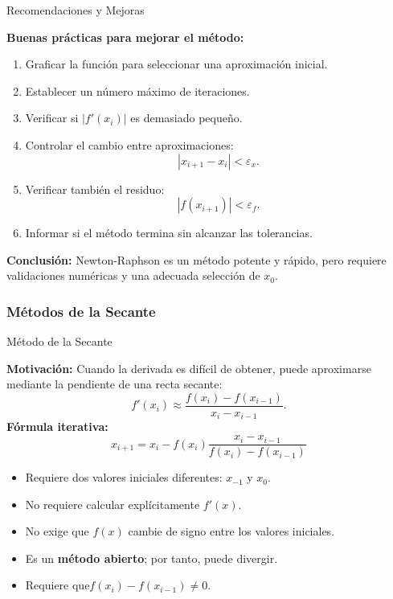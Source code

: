 \documentclass[../../main.tex]{subfiles}
\begin{document}

\begin{frame}{Recomendaciones y Mejoras}

\textbf{Buenas prácticas para mejorar el método:}

\begin{enumerate}
  \item Graficar la función para seleccionar una aproximación inicial.
  \item Establecer un número máximo de iteraciones.
  \item Verificar si \(|f'(x_i)|\) es demasiado pequeño.
  \item Controlar el cambio entre aproximaciones:
  \[
    |x_{i+1}-x_i|<\varepsilon_x.
  \]
  \item Verificar también el residuo:
  \[
    |f(x_{i+1})|<\varepsilon_f.
  \]
  \item Informar si el método termina sin alcanzar las tolerancias.
\end{enumerate}

\textbf{Conclusión:}
Newton-Raphson es un método potente y rápido, pero requiere
validaciones numéricas y una adecuada selección de \(x_0\).

\end{frame}




\subsubsection{Métodos de la Secante}

\begin{frame}{Método de la Secante}

\textbf{Motivación:}
Cuando la derivada es difícil de obtener, puede aproximarse mediante
la pendiente de una recta secante:
\[
f'(x_i)
\approx
\frac{f(x_i)-f(x_{i-1})}{x_i-x_{i-1}}.
\]
\textbf{Fórmula iterativa:}
\[
\boxed{
x_{i+1}
=
x_i
-
f(x_i)
\frac{x_i-x_{i-1}}
{f(x_i)-f(x_{i-1})}
}
\]

\begin{itemize}
  \item Requiere dos valores iniciales diferentes:
        \(x_{-1}\) y \(x_0\).
  \item No requiere calcular explícitamente \(f'(x)\).
  \item No exige que \(f(x)\) cambie de signo entre los valores iniciales.
  \item Es un \textbf{método abierto}; por tanto, puede divergir.
  \item Requiere que\(
  f(x_i)-f(x_{i-1})\neq0.
  \)
\end{itemize}

\end{frame}
\end{document}
